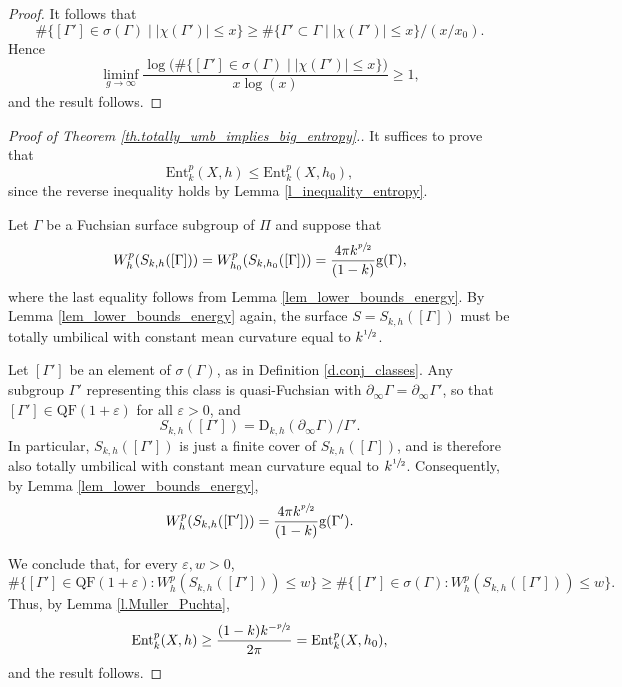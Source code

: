 \documentclass[10pt]{amsart}
\theoremstyle{plain}
\theoremstyle{definition}
\let\eps\varepsilon
\newcommand{\Ent}{\mathrm{Ent}}
\newcommand{\QF}{\mathrm{QF}}
\newcommand{\bord}{\partial_{\infty}}
\begin{document}
\begin{proof}
It follows that
\begin{equation*}
\#\{[\Gamma']\in\sigma(\Gamma)\mid \left|\chi(\Gamma')\right| \leq x\}
\geq \#\{\Gamma'\subset\Gamma\mid \left|\chi(\Gamma')\right| \leq x\}/(x/x_0).
\end{equation*}
Hence
\begin{equation*}
\liminf_{g\to\infty}\frac{\log\bigl(\#\{[\Gamma']\in\sigma(\Gamma)\mid \left|\chi(\Gamma')\right|\leq x\}\bigr)}{x\log(x)} \geq 1,
\end{equation*}
and the result follows.
\end{proof}

\begin{proof}[Proof of Theorem \ref{th.totally_umb_implies_big_entropy}.] It suffices to prove that
\begin{equation*}
\Ent^{p}_{k}(X,h)\leq\Ent^{p}_{k}(X,h_0),
\end{equation*}
since the reverse inequality holds by Lemma \ref{l_inequality_entropy}.

Let $\Gamma$ be a Fuchsian surface subgroup of $\Pi$ and suppose that
\begin{equation*}
W^{p}_{h}(S_{k,h}([\Gamma]))=W^{p}_{h_0}(S_{k,h_0}([\Gamma]))=\frac{4\pi k^{\sfrac{p}{2}}}{(1-k)}\mathrm{g}(\Gamma),
\end{equation*}
where the last equality follows from Lemma \ref{lem_lower_bounds_energy}. By Lemma \ref{lem_lower_bounds_energy} again, the surface $S=S_{k,h}([\Gamma])$ must be totally umbilical with constant mean curvature equal to $k^{\sfrac{1}{2}}$.

Let $[\Gamma']$ be an element of $\sigma(\Gamma)$, as in Definition \ref{d.conj_classes}. Any subgroup $\Gamma'$ representing this class is quasi-Fuchsian with $\bord \Gamma=\bord \Gamma'$, so that $[\Gamma']\in\QF(1+\eps)$ for all $\eps>0$, and
\begin{equation*}
S_{k,h}([\Gamma'])=\mathrm{D}_{k,h}(\bord \Gamma)/\Gamma'.
\end{equation*}
In particular, $S_{k,h}([\Gamma'])$ is just a finite cover of $S_{k,h}([\Gamma])$, and is therefore also totally umbilical with constant mean curvature equal to $k^{\sfrac{1}{2}}$. Consequently, by Lemma \ref{lem_lower_bounds_energy},
\begin{equation*}
W^{p}_{h}(S_{k,h}([\Gamma']))=\frac{4\pi k^{\sfrac{p}{2}}}{(1-k)}\mathrm{g}(\Gamma').
\end{equation*}

We conclude that, for every $\eps,w>0$,
\begin{equation*}
\#\{[\Gamma']\in\QF(1+\eps):W^{p}_{h}(S_{k,h}([\Gamma']))\leq w\}\geq \#\{[\Gamma']\in\sigma(\Gamma):W^{p}_{h}(S_{k,h}([\Gamma']))\leq w\}.
\end{equation*}
Thus, by Lemma \ref{l.Muller_Puchta},
\begin{equation*}
\Ent^{p}_{k}(X,h)\geq\frac{(1-k)k^{-\sfrac{p}{2}}}{2\pi}=\Ent^{p}_{k}(X,h_0),
\end{equation*}
and the result follows.
\end{proof}
\end{document}
